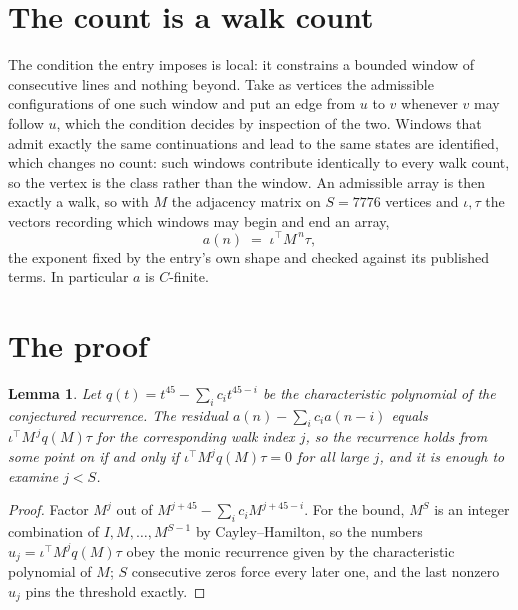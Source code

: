 \documentclass[11pt,a4paper]{article}
\theoremstyle{plain}
\newtheorem{lemma}[theorem]{Lemma}
\theoremstyle{definition}
\begin{document}
\section{The count is a walk count}

The condition the entry imposes is local: it constrains a bounded window of consecutive lines and nothing beyond. Take as
vertices the admissible configurations of one such window and put an edge from $u$ to $v$
whenever $v$ may follow $u$, which the condition decides by inspection of the two. Windows that admit exactly the same continuations and lead to the same states are identified, which changes no count: such windows contribute identically to every walk count, so the vertex is the class rather than the window. An
admissible array is then exactly a walk, so with $M$ the adjacency matrix on $S=7776$ vertices
and $\iota,\tau$ the vectors recording which windows may begin and end an array,
\[
a(n)\;=\;\iota^{\!\top}M^{\,n}\tau ,
\]
the exponent fixed by the entry's own shape and checked against its published terms. In
particular $a$ is $C$-finite.

\section{The proof}

\begin{lemma}\label{lem:crit}
Let $q(t)=t^{45}-\sum_i c_it^{45-i}$ be the characteristic polynomial of the
conjectured recurrence. The residual $a(n)-\sum_ic_ia(n-i)$ equals
$\iota^{\!\top}M^{\,j}q(M)\tau$ for the corresponding walk index $j$, so the recurrence
holds from some point on if and only if $\iota^{\!\top}M^{j}q(M)\tau=0$ for all large $j$,
and it is enough to examine $j<S$.
\end{lemma}

\begin{proof}
Factor $M^{j}$ out of $M^{j+45}-\sum_ic_iM^{j+45-i}$. For the bound, $M^{S}$
is an integer combination of $I,M,\dots,M^{S-1}$ by Cayley--Hamilton, so the numbers
$u_j=\iota^{\!\top}M^{j}q(M)\tau$ obey the monic recurrence given by the characteristic
polynomial of $M$; $S$ consecutive zeros force every later one, and the last nonzero $u_j$
pins the threshold exactly.
\end{proof}
\end{document}
